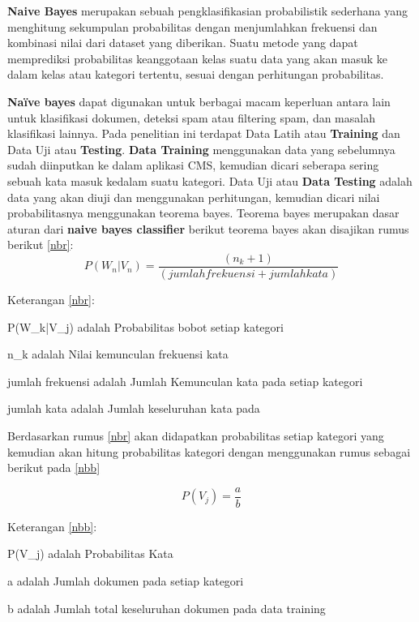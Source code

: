\par \textbf{Naive Bayes} merupakan sebuah pengklasifikasian probabilistik sederhana yang menghitung sekumpulan probabilitas dengan menjumlahkan frekuensi dan kombinasi nilai dari dataset yang diberikan. Suatu metode yang dapat memprediksi probabilitas keanggotaan kelas suatu data yang akan masuk ke dalam kelas atau kategori tertentu, sesuai dengan perhitungan probabilitas.
\par \textbf{Naïve bayes} dapat digunakan untuk berbagai macam keperluan antara lain untuk klasifikasi dokumen, deteksi spam atau filtering spam, dan masalah klasifikasi lainnya. Pada penelitian ini terdapat Data Latih atau \textbf{Training} dan Data Uji atau \textbf{Testing}.\textbf{ Data Training} menggunakan data yang sebelumnya sudah diinputkan ke dalam aplikasi CMS, kemudian dicari seberapa sering sebuah kata masuk kedalam suatu kategori. Data Uji atau \textbf{Data Testing} adalah data yang akan diuji dan menggunakan perhitungan, kemudian dicari nilai probabilitasnya menggunakan teorema bayes. Teorema bayes merupakan dasar aturan dari \textbf{naive bayes classifier} berikut teorema bayes akan disajikan rumus berikut \ref{nbr}:
\begin{equation}
\label{nbr}
    P(W_n|V_n) = \frac{(n_k + 1)}{(jumlah frekuensi + jumlah kata)} 
\end{equation} 
\par Keterangan \ref{nbr}:
\par P(W_k|V_j) adalah Probabilitas bobot setiap kategori
\par n_k adalah Nilai kemunculan frekuensi kata
\par jumlah frekuensi adalah Jumlah Kemunculan kata pada setiap kategori
\par jumlah kata adalah Jumlah keseluruhan kata pada 

\par Berdasarkan rumus \ref{nbr} akan didapatkan probabilitas setiap kategori yang kemudian akan hitung probabilitas kategori dengan menggunakan rumus sebagai berikut pada \ref{nbb}

\begin{equation}
\label{nbb}
    P(V_j) = \frac{a}{b} 
\end{equation} 

\par Keterangan \ref{nbb}:
\par P(V_j) adalah Probabilitas Kata
\par a adalah Jumlah dokumen pada setiap kategori
\par b adalah Jumlah total keseluruhan dokumen pada data training

